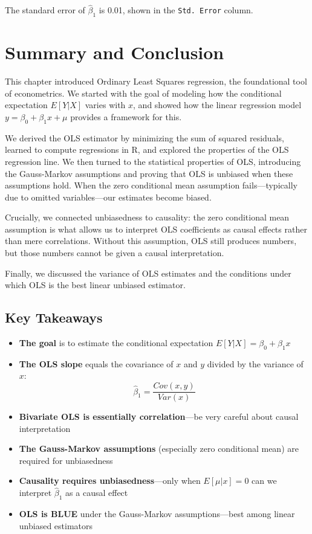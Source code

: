 \documentclass[
  letterpaper,
  DIV=11,
  numbers=noendperiod]{scrreprt}
\begin{document}
The standard error of \(\hat{\beta}_1\) is 0.01, shown in the
\texttt{Std.\ Error} column.

\section{Summary and Conclusion}\label{summary-and-conclusion-2}

This chapter introduced Ordinary Least Squares regression, the
foundational tool of econometrics. We started with the goal of modeling
how the conditional expectation \(E[Y|X]\) varies with \(x\), and showed
how the linear regression model \(y = \beta_0 + \beta_1 x + \mu\)
provides a framework for this.

We derived the OLS estimator by minimizing the sum of squared residuals,
learned to compute regressions in R, and explored the properties of the
OLS regression line. We then turned to the statistical properties of
OLS, introducing the Gauss-Markov assumptions and proving that OLS is
unbiased when these assumptions hold. When the zero conditional mean
assumption fails---typically due to omitted variables---our estimates
become biased.

Crucially, we connected unbiasedness to causality: the zero conditional
mean assumption is what allows us to interpret OLS coefficients as
causal effects rather than mere correlations. Without this assumption,
OLS still produces numbers, but those numbers cannot be given a causal
interpretation.

Finally, we discussed the variance of OLS estimates and the conditions
under which OLS is the best linear unbiased estimator.

\subsection{Key Takeaways}\label{key-takeaways-2}

\begin{itemize}
\item
  \textbf{The goal} is to estimate the conditional expectation
  \(E[Y|X] = \beta_0 + \beta_1 x\)
\item
  \textbf{The OLS slope} equals the covariance of \(x\) and \(y\)
  divided by the variance of \(x\):
  \[\hat{\beta}_1 = \frac{Cov(x,y)}{Var(x)}\]
\item
  \textbf{Bivariate OLS is essentially correlation}---be very careful
  about causal interpretation
\item
  \textbf{The Gauss-Markov assumptions} (especially zero conditional
  mean) are required for unbiasedness
\item
  \textbf{Causality requires unbiasedness}---only when \(E[\mu|x] = 0\)
  can we interpret \(\hat{\beta}_1\) as a causal effect
\item
  \textbf{OLS is BLUE} under the Gauss-Markov assumptions---best among
  linear unbiased estimators
\end{itemize}
\end{document}

